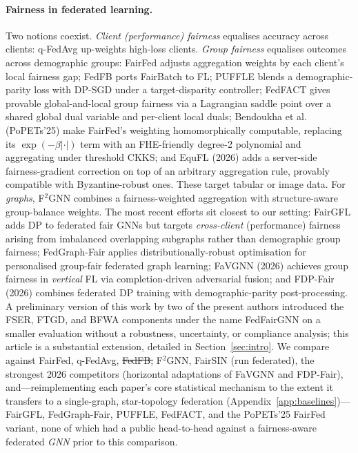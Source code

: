 \documentclass[pdflatex,sn-mathphys-num]{sn-jnl}
\makeatletter
\theoremstyle{thmstyleone}%
\theoremstyle{thmstyletwo}%
\theoremstyle{thmstylethree}%
\providecommand{\DIFdel}[1]{{\protect\color{red}\sout{#1}}} %
\providecommand{\DIFdelbegin}{} %
\providecommand{\DIFdelend}{} %
\providecommand{\DIFscaledelfig}{0.5}
\newlength{\DIFdelgraphicswidth} %
\newlength{\DIFdelgraphicsheight} %
\providecommand{\DIFdelincludegraphics}[2][]{%
\sbox{\DIFdelgraphicsbox}{\DIFOincludegraphics[#1]{#2}}%
\settoboxwidth{\DIFdelgraphicswidth}{\DIFdelgraphicsbox} %
\settoboxtotalheight{\DIFdelgraphicsheight}{\DIFdelgraphicsbox} %
\scalebox{\DIFscaledelfig}{%
\parbox[b]{\DIFdelgraphicswidth}{\usebox{\DIFdelgraphicsbox}\\[-\baselineskip] \rule{\DIFdelgraphicswidth}{0em}}\llap{\resizebox{\DIFdelgraphicswidth}{\DIFdelgraphicsheight}{%
\setlength{\unitlength}{\DIFdelgraphicswidth}%
\begin{picture}(1,1)%
\thicklines\linethickness{2pt} %
{\color[rgb]{1,0,0}\put(0,0){\framebox(1,1){}}}%
{\color[rgb]{1,0,0}\put(0,0){\line( 1,1){1}}}%
{\color[rgb]{1,0,0}\put(0,1){\line(1,-1){1}}}%
\end{picture}%
}\hspace*{3pt}}} %
} %
\DeclareRobustCommand{\DIFdelbegin}{\DIFOdelbegin \let\includegraphics\DIFdelincludegraphics} %
\DeclareRobustCommand{\DIFdelend}{\DIFOaddend \let\includegraphics\DIFOincludegraphics} %
\let\sout@orig\sout %
\renewcommand{\sout}[1]{\ifmmode\text{\sout@orig{\ensuremath{#1}}}\else\sout@orig{#1}\fi} %
\makeatother
\begin{document}
\paragraph{Fairness in federated learning.}
Two notions coexist. \emph{Client (performance) fairness} equalises accuracy
across clients: q-FedAvg \cite{li2020fair} up-weights high-loss clients.
\emph{Group fairness} equalises outcomes across demographic groups: FairFed
\cite{ezzeldin2023fairfed} adjusts aggregation weights by each client's local
fairness gap; FedFB ports FairBatch to FL; PUFFLE \cite{corbucci2024puffle}
blends a demographic-parity loss with DP-SGD under a target-disparity
controller; FedFACT \cite{fedfact2025} gives provable global-and-local group
fairness via a Lagrangian saddle point over a shared global dual variable and
per-client local duals; Bendoukha et al.\ \cite{bendoukha2025popets}
(PoPETs'25) make FairFed's weighting homomorphically computable, replacing its
$\exp(-\beta|\cdot|)$ term with an FHE-friendly degree-2 polynomial and
aggregating under threshold CKKS; and EquFL \cite{yu2026equfl} (2026) adds a
server-side fairness-gradient correction on top of an arbitrary aggregation
rule, provably compatible with Byzantine-robust ones. These target tabular or
image data. For
\emph{graphs}, F$^2$GNN \cite{f2gnn2023} combines a fairness-weighted
aggregation with structure-aware group-balance weights. The most recent
efforts sit closest to our setting: FairGFL \cite{fairgfl2026} adds DP to
federated fair GNNs but targets \emph{cross-client} (performance) fairness
arising from imbalanced overlapping subgraphs rather than demographic group
fairness; FedGraph-Fair \cite{fedgraphfair2026} applies distributionally-robust
optimisation for personalised group-fair federated graph learning; FaVGNN
\cite{wang2026favgnn} (2026) achieves group fairness in \emph{vertical} FL via
completion-driven adversarial fusion; and FDP-Fair \cite{xue2026fdpfair} (2026)
combines federated DP training with demographic-parity post-processing. A
preliminary version of this work by two of the present authors
\cite{dang2026fedfairgnn} introduced the FSER, FTGD, and BFWA components under
the name FedFairGNN on a smaller evaluation without a robustness, uncertainty,
or compliance analysis; this article is a
substantial
extension, detailed in Section~\ref{sec:intro}. We
compare against FairFed, q-FedAvg, \DIFdelbegin \DIFdel{FedFB, }\DIFdelend F$^2$GNN, FairSIN (run federated),
the strongest 2026 competitors (horizontal adaptations of FaVGNN and FDP-Fair),
and---reimplementing each paper's core statistical mechanism to the extent it
transfers to a single-graph, star-topology federation
(Appendix~\ref{app:baselines})---FairGFL, FedGraph-Fair, PUFFLE, FedFACT, and
the PoPETs'25 FairFed variant, none of which had a public head-to-head against
a fairness-aware federated \emph{GNN} prior to this comparison.
\end{document}

